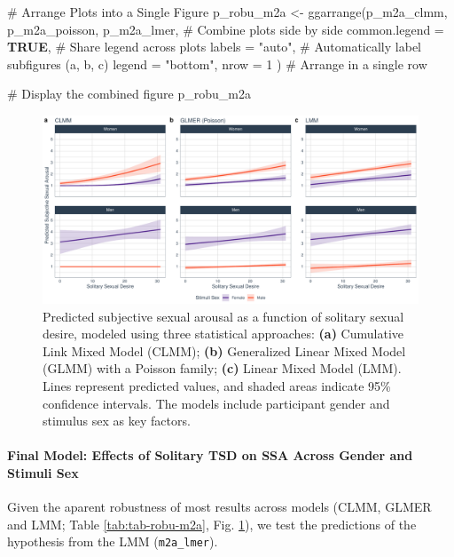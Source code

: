 \documentclass[
  bookmarksnumbered]{article}
\newenvironment{Shaded}{\begin{snugshade}}{\end{snugshade}}
\newcommand{\AttributeTok}[1]{\textcolor[rgb]{0.80,0.80,0.80}{#1}}
\newcommand{\CommentTok}[1]{\textcolor[rgb]{0.50,0.62,0.50}{#1}}
\newcommand{\ConstantTok}[1]{\textcolor[rgb]{0.86,0.64,0.64}{\textbf{#1}}}
\newcommand{\DecValTok}[1]{\textcolor[rgb]{0.86,0.86,0.80}{#1}}
\newcommand{\FunctionTok}[1]{\textcolor[rgb]{0.94,0.94,0.56}{#1}}
\newcommand{\NormalTok}[1]{\textcolor[rgb]{0.80,0.80,0.80}{#1}}
\newcommand{\OtherTok}[1]{\textcolor[rgb]{0.94,0.94,0.56}{#1}}
\newcommand{\StringTok}[1]{\textcolor[rgb]{0.80,0.58,0.58}{#1}}
\begin{document}
\begin{Shaded}
\begin{Highlighting}[]
\CommentTok{\# Arrange Plots into a Single Figure}
\NormalTok{p\_robu\_m2a }\OtherTok{\textless{}{-}} \FunctionTok{ggarrange}\NormalTok{(p\_m2a\_clmm, p\_m2a\_poisson, p\_m2a\_lmer, }\CommentTok{\# Combine plots side by side}
  \AttributeTok{common.legend =} \ConstantTok{TRUE}\NormalTok{, }\CommentTok{\# Share legend across plots}
  \AttributeTok{labels =} \StringTok{"auto"}\NormalTok{, }\CommentTok{\# Automatically label subfigures (a, b, c)}
  \AttributeTok{legend =} \StringTok{"bottom"}\NormalTok{,}
  \AttributeTok{nrow =} \DecValTok{1}
\NormalTok{) }\CommentTok{\# Arrange in a single row}

\CommentTok{\# Display the combined figure}
\NormalTok{p\_robu\_m2a}
\end{Highlighting}
\end{Shaded}

\begin{figure}
\centering
\includegraphics{Sexual_Desire_Arousal_V2_files/figure-latex/preds-m2a-1.pdf}
\caption{\label{fig:preds-m2a}Predicted subjective sexual arousal as a function of solitary sexual desire, modeled using three statistical approaches: \textbf{(a)} Cumulative Link Mixed Model (CLMM); \textbf{(b)} Generalized Linear Mixed Model (GLMM) with a Poisson family; \textbf{(c)} Linear Mixed Model (LMM). Lines represent predicted values, and shaded areas indicate 95\% confidence intervals. The models include participant gender and stimulus sex as key factors.}
\end{figure}

\paragraph{Final Model: Effects of Solitary TSD on SSA Across Gender and Stimuli Sex}\label{final-model-effects-of-solitary-tsd-on-ssa-across-gender-and-stimuli-sex}

Given the aparent robustness of most results across models (CLMM, GLMER and LMM; Table \ref{tab:tab-robu-m2a}, Fig. \ref{fig:preds-m2a}), we test the predictions of the hypothesis from the LMM (\texttt{m2a\_lmer}).
\end{document}
